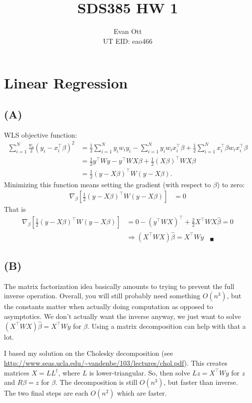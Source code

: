\documentclass{article}
\title{\vspace{-6ex}SDS385 HW 1\vspace{-2ex}}
\author{Evan Ott \\ UT EID: eao466\vspace{-2ex}}
\begin{document}
\maketitle
\section{Linear Regression}
\subsection{(A)}
WLS objective function:
\begin{align*}
\sum_{i=1}^N\frac{w_i}{2}(y_i-x_i^\top\beta)^2&=\frac{1}{2}\sum_{i=1}^Ny_iw_iy_i - \sum_{i=1}^Ny_iw_ix_i^\top\beta+\frac{1}{2}\sum_{i=1}^Nx_i^\top\beta w_ix_i^\top\beta\\
&=\frac{1}{2}y^\top W y - y^\top W X \beta + \frac{1}{2}(X\beta)^\top WX\beta\\
&=\frac{1}{2}(y-X\beta)^\top W(y-X\beta).
\end{align*}
Minimizing this function means setting the gradient (with respect to $\beta$) to zero:
\begin{align*}
\nabla_\beta\left[\frac{1}{2}(y-X\beta)^\top W(y-X\beta)\right]&=0
\end{align*}
That is
\begin{align*}
\nabla_\beta\left[\frac{1}{2}(y-X\beta)^\top W(y-X\beta)\right]&=0-(y^\top WX)^\top+\frac{2}{2}X^\top WX\hat{\beta}=0\\
&\Rightarrow (X^\top WX)\hat{\beta}=X^\top Wy~~~~_\blacksquare
\end{align*}

\subsection{(B)}
The matrix factorization idea basically amounts to trying to prevent the full inverse operation. Overall, you will still probably need something $O(n^3)$, but the constants matter when actually doing computation as opposed to asymptotics. We don't actually want the inverse anyway, we just want to solve $(X^\top WX)\hat{\beta}=X^\top Wy$ for $\beta$. Using a matrix
decomposition can help with that a lot.

I based my solution on the Cholesky decomposition (see \url{http://www.seas.ucla.edu/~vandenbe/103/lectures/chol.pdf}). This creates matrices $X=LL^\dagger$, where $L$ is lower-triangular. So, then solve $Lz=X^\top Wy$ for $z$ and $R\beta=z$ for $\beta$. The decomposition is still $O(n^3)$,
but faster than inverse. The two final steps are each $O(n^2)$ which are faster.
\end{document}
